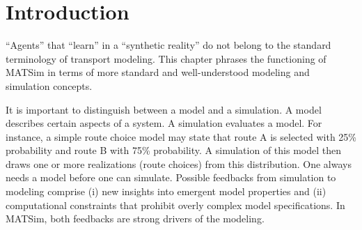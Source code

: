 \usepackage{color}
\usepackage{pstricks}
\usepackage{pst-node}
\usepackage{pstcol}
\usepackage{pst-plot}
\usepackage{bbding}

\usepackage{soul}

\makeatother

\usepackage{babel}


\newcommand{\MyEqRef}[1]{(\ref{#1})}

\newcommand{\note}[1]{\hl{[#1]}}
\newcommand{\Note}[1]{\note{#1}}

\newcommand{\Gunnar}[1]{\note{Gunnar: #1}}
\newcommand{\gunnar}[1]{\Gunnar{#1}}
\newcommand{\gf}[1]{\Gunnar{#1}}
\newcommand{\GF}[1]{\Gunnar{#1}}


\section{Introduction}

{}``Agents'' that {}``learn'' in a {}``synthetic reality'' do
not belong to the standard terminology of transport modeling. This
chapter phrases the functioning of MATSim in terms of more standard
and well-understood modeling and simulation concepts.

It is important to distinguish between a model and a simulation. A
model describes certain aspects of a system. A simulation evaluates
a model. For instance, a simple route choice model may state that
route A is selected with 25\% probability and route B with 75\% probability.
A simulation of this model then draws one or more realizations (route
choices) from this distribution. One always needs a model before one
can simulate. Possible feedbacks from simulation to modeling comprise
(i) new insights into emergent model properties and (ii) computational
constraints that prohibit overly complex model specifications. In
MATSim, both feedbacks are strong drivers of the modeling. 

